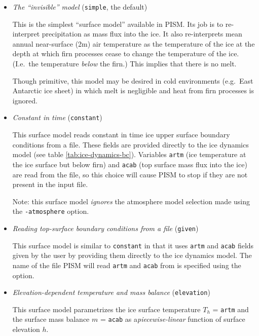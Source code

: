 \begin{itemize}
  \item \emph{The ``invisible'' model} (\texttt{simple}, the default)

    This is the simplest ``surface model'' available in PISM.  Its job is to re-interpret  precipitation as mass flux into the ice.  It also re-interprets mean annual near-surface (2m) air temperature as the temperature of the ice at the depth at which firn processes cease to change the temperature of the ice.  (I.e.~the temperature \emph{below} the firn.)  This implies that there is no melt.

    Though primitive, this model may be desired in cold environments (e.g.~East Antarctic ice sheet) in which melt is negligible and heat from firn processes is ignored.

  \item \emph{Constant in time} (\texttt{constant})

    This surface model reads constant in time ice upper surface boundary conditions from a file.  These fields are provided directly to the ice dynamics model (see table \ref{tab:ice-dynamics-bc}).  Variables \texttt{artm} (ice temperature at the ice surface but below firn) and \texttt{acab} (top surface mass flux into the ice) are read from the file, so this choice will cause PISM to stop if they are not present in the input file.

    Note: this surface model \emph{ignores} the atmosphere model selection made using the \texttt{-atmosphere} option.

  \item \emph{Reading top-surface boundary conditions from a file} (\texttt{given})

    This surface model is similar to \texttt{constant} in that it uses \texttt{artm} and \texttt{acab} fields given by the user by providing them directly to the ice dynamics model. The name of the file PISM will read \texttt{artm} and \texttt{acab} from is specified using the  option.

  \item \emph{Elevation-dependent temperature and mass balance} (\texttt{elevation})

    This surface model parametrizes the ice surface temperature $T_{h}$ = \texttt{artm} and the surface mass balance $m$ = \texttt{acab} as a\emph{piecewise-linear} function of surface elevation $h$.


\end{itemize}
